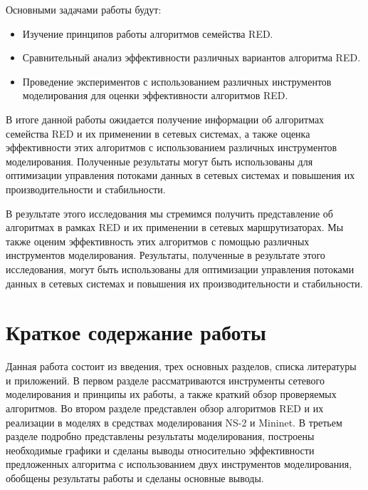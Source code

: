 Основными задачами работы будут:

\begin{itemize}
        \item Изучение принципов работы алгоритмов семейства RED.
        \item Сравнительный анализ эффективности различных вариантов алгоритма RED.
        \item Проведение экспериментов с использованием различных инструментов моделирования для оценки эффективности алгоритмов RED.
\end{itemize}

В итоге данной работы ожидается получение информации об алгоритмах семейства
RED и их применении в сетевых системах, а также оценка эффективности этих
алгоритмов с использованием различных инструментов моделирования. Полученные
результаты могут быть использованы для оптимизации управления потоками данных в
сетевых системах и повышения их производительности и стабильности.

В результате этого исследования мы стремимся получить представление об
алгоритмах в рамках RED и их применении в сетевых маршрутизаторах. Мы также
оценим эффективность этих алгоритмов с помощью различных инструментов
моделирования. Результаты, полученные в результате этого исследования, могут
быть использованы для оптимизации управления потоками данных в сетевых системах
и повышения их производительности и стабильности.


\section*{Краткое содержание работы}

Данная работа состоит из введения, трех основных разделов, списка литературы и
приложений. В первом разделе рассматриваются инструменты сетевого моделирования
и принципы их работы, а также краткий обзор проверяемых алгоритмов. Во втором
разделе представлен обзор алгоритмов RED и их реализации в моделях в средствах
моделирования NS-2 и Mininet. В третьем разделе подробно представлены
результаты моделирования, построены необходимые графики и сделаны выводы
относительно эффективности предложенных алгоритма с использованием двух
инструментов моделирования, обобщены результаты работы и сделаны основные
выводы.





